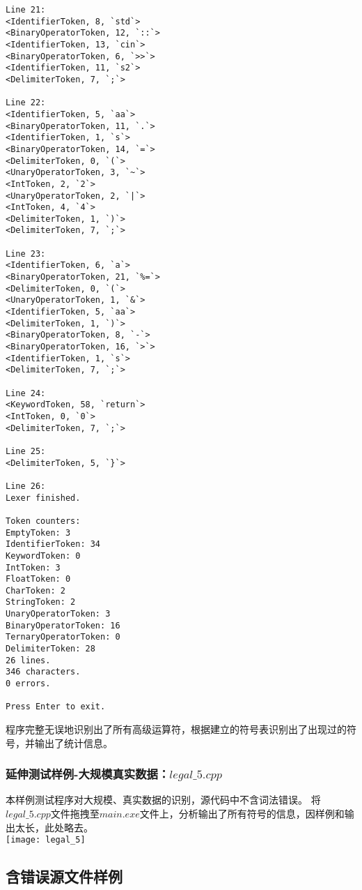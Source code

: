 \documentclass[UTF8]{ctexart}
\begin{document}
\begin{lstlisting}
Line 21:
<IdentifierToken, 8, `std`>
<BinaryOperatorToken, 12, `::`>
<IdentifierToken, 13, `cin`>
<BinaryOperatorToken, 6, `>>`>
<IdentifierToken, 11, `s2`>
<DelimiterToken, 7, `;`>

Line 22:
<IdentifierToken, 5, `aa`>
<BinaryOperatorToken, 11, `.`>
<IdentifierToken, 1, `s`>
<BinaryOperatorToken, 14, `=`>
<DelimiterToken, 0, `(`>
<UnaryOperatorToken, 3, `~`>
<IntToken, 2, `2`>
<UnaryOperatorToken, 2, `|`>
<IntToken, 4, `4`>
<DelimiterToken, 1, `)`>
<DelimiterToken, 7, `;`>

Line 23:
<IdentifierToken, 6, `a`>
<BinaryOperatorToken, 21, `%=`>
<DelimiterToken, 0, `(`>
<UnaryOperatorToken, 1, `&`>
<IdentifierToken, 5, `aa`>
<DelimiterToken, 1, `)`>
<BinaryOperatorToken, 8, `-`>
<BinaryOperatorToken, 16, `>`>
<IdentifierToken, 1, `s`>
<DelimiterToken, 7, `;`>

Line 24:
<KeywordToken, 58, `return`>
<IntToken, 0, `0`>
<DelimiterToken, 7, `;`>

Line 25:
<DelimiterToken, 5, `}`>

Line 26:
Lexer finished.

Token counters:
EmptyToken: 3
IdentifierToken: 34
KeywordToken: 0
IntToken: 3
FloatToken: 0
CharToken: 2
StringToken: 2
UnaryOperatorToken: 3
BinaryOperatorToken: 16
TernaryOperatorToken: 0
DelimiterToken: 28
26 lines.
346 characters.
0 errors.

Press Enter to exit.
\end{lstlisting}
程序完整无误地识别出了所有高级运算符，根据建立的符号表识别出了出现过的符号，并输出了统计信息。
\subsubsection{延伸测试样例-大规模真实数据：$legal\_5.cpp$}
本样例测试程序对大规模、真实数据的识别，源代码中不含词法错误。
将$legal\_5.cpp$文件拖拽至$main.exe$文件上，分析输出了所有符号的信息，因样例和输出太长，此处略去。 \\
\texttt{[image: legal\_5]}
\subsection{含错误源文件样例}
\end{document}
